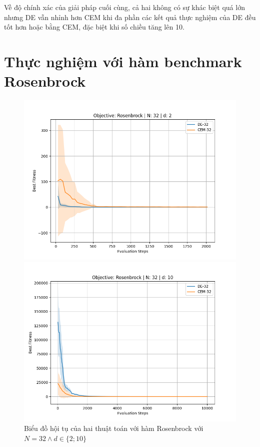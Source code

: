 \documentclass[10pt]{report}
\begin{document}
Về độ chính xác của giải pháp cuối cùng, cả hai không có sự khác biệt quá lớn nhưng DE vẫn nhỉnh hơn CEM khi đa phần các kết quả thực nghiệm của DE đều tốt hơn hoặc bằng CEM, đặc biệt khi số chiều tăng lên 10.

\section{Thực nghiệm với hàm benchmark Rosenbrock}
\begin{figure}[H]\centering
	\label{figure:rosenbrock_comparison}
	\caption{Biểu đồ hội tụ của hai thuật toán với hàm Rosenbrock với \(N = 32 \wedge d \in \{2; 10\}\)}
	\begin{minipage}{0.45\textwidth}\centering
		\includegraphics[width=\textwidth]{../assets/graphs/objective=Rosenbrock_N=32_d=2.png}
	\end{minipage}
	\begin{minipage}{0.45\textwidth}\centering
		\includegraphics[width=\textwidth]{../assets/graphs/objective=Rosenbrock_N=32_d=10.png}
	\end{minipage}
\end{figure}
\end{document}
